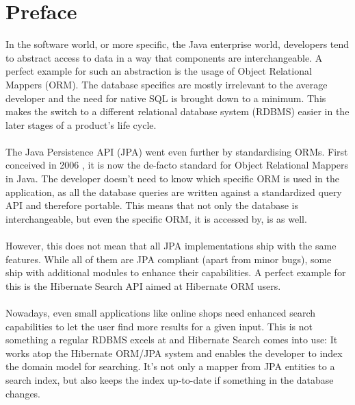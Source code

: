 \section{Preface}\label{Preface}
In the software world, or more specific, the Java enterprise world, developers tend to abstract access to data in a way that components are interchangeable. A perfect example for such an abstraction is the usage of Object Relational Mappers (ORM). The database specifics are mostly irrelevant to the average developer and the need for native SQL is brought down to a minimum. This makes the switch to a different relational database system (RDBMS) easier in the later stages of a product's life cycle.
\\\\
The Java Persistence API (JPA) went even further by standardising ORMs. First conceived in 2006 \cite{needed}, it is now the de-facto standard for Object Relational Mappers in Java. The developer doesn't need to know which specific ORM is used in the application, as all the database queries are written against a standardized query API and therefore portable. This means that not only the database is interchangeable, but even the specific ORM, it is accessed by, is as well.
\\\\
However, this does not mean that all JPA implementations ship with the same features. While all of them are JPA compliant (apart from minor bugs), some ship with additional modules to enhance their capabilities. A perfect example for this is the Hibernate Search API aimed at Hibernate ORM users.
\\\\
Nowadays, even small applications like online shops need enhanced search capabilities to let the user find more results for a given input.
This is not something a regular RDBMS excels at and Hibernate Search comes into use: It works atop the Hibernate ORM/JPA system and enables the developer to index the domain model for searching. It's not only a mapper from JPA entities to a search index, but also keeps the index up-to-date if something in the database changes.
\\\\
